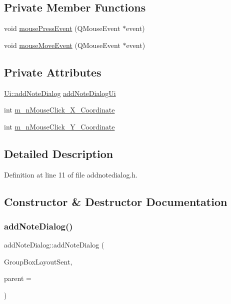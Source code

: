 \subsection*{Private Member Functions}
\begin{DoxyCompactItemize}
\item 
void \hyperlink{classaddNoteDialog_a5479e71fa86229b5d3a2e03ffd3ddbeb}{mouse\+Press\+Event} (Q\+Mouse\+Event $\ast$event)
\item 
void \hyperlink{classaddNoteDialog_a56670c6227c03bc1277f22789e7876e4}{mouse\+Move\+Event} (Q\+Mouse\+Event $\ast$event)
\end{DoxyCompactItemize}
\subsection*{Private Attributes}
\begin{DoxyCompactItemize}
\item 
\hyperlink{classUi_1_1addNoteDialog}{Ui\+::add\+Note\+Dialog} \hyperlink{classaddNoteDialog_a4fd2dea6a480150e92f58bc0d415a83e}{add\+Note\+Dialog\+Ui}
\item 
int \hyperlink{classaddNoteDialog_af54413cf6c84a6610266d9c616f44541}{m\+\_\+n\+Mouse\+Click\+\_\+\+X\+\_\+\+Coordinate}
\item 
int \hyperlink{classaddNoteDialog_aeb0351ab1bbcc76899f21224ddf4d374}{m\+\_\+n\+Mouse\+Click\+\_\+\+Y\+\_\+\+Coordinate}
\end{DoxyCompactItemize}


\subsection{Detailed Description}


Definition at line 11 of file addnotedialog.\+h.



\subsection{Constructor \& Destructor Documentation}
\hypertarget{classaddNoteDialog_afc2d1dcbc9b0e6139859c61606c7f9f1}{}\label{classaddNoteDialog_afc2d1dcbc9b0e6139859c61606c7f9f1} 
\subsubsection{\texorpdfstring{add\+Note\+Dialog()}{addNoteDialog()}}
{\footnotesize\ttfamily add\+Note\+Dialog\+::add\+Note\+Dialog (\begin{DoxyParamCaption}\item[{Q\+V\+Box\+Layout $\ast$}]{Group\+Box\+Layout\+Sent,  }\item[{Q\+Widget $\ast$}]{parent = {} }\end{DoxyParamCaption})}




